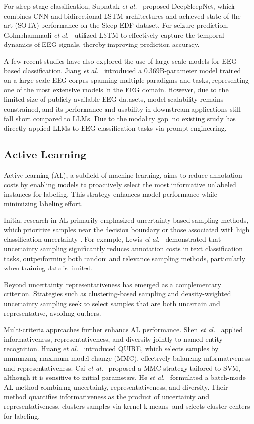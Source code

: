\documentclass[journal,twocolumn]{IEEEtran}
\begin{document}
For sleep stage classification, Supratak \textit{et al.}~\cite{supratak2017deepsleepnet} proposed DeepSleepNet, which combines CNN and bidirectional LSTM architectures and achieved state-of-the-art (SOTA) performance on the Sleep-EDF dataset. For seizure prediction, Golmohammadi \textit{et al.}~\cite{golmohammadi2017gated} utilized LSTM to effectively capture the temporal dynamics of EEG signals, thereby improving prediction accuracy.

A few recent studies have also explored the use of large-scale models for EEG-based classification. Jiang \textit{et al.}~\cite{jiang2024large} introduced a 0.369B-parameter model trained on a large-scale EEG corpus spanning multiple paradigms and tasks, representing one of the most extensive models in the EEG domain. However, due to the limited size of publicly available EEG datasets, model scalability remains constrained, and its performance and usability in downstream applications still fall short compared to LLMs. Due to the modality gap, no existing study has directly applied LLMs to EEG classification tasks via prompt engineering.

\subsection{Active Learning}
Active learning (AL), a subfield of machine learning, aims to reduce annotation costs by enabling models to proactively select the most informative unlabeled instances for labeling. This strategy enhances model performance while minimizing labeling effort.

Initial research in AL primarily emphasized uncertainty-based sampling methods, which prioritize samples near the decision boundary or those associated with high classification uncertainty \cite{Settles2009}. For example, Lewis \textit{et al.}~\cite{lewis1995sequential} demonstrated that uncertainty sampling significantly reduces annotation costs in text classification tasks, outperforming both random and relevance sampling methods, particularly when training data is limited.

Beyond uncertainty, representativeness has emerged as a complementary criterion. Strategies such as clustering-based sampling \cite{nguyen2004active} and density-weighted uncertainty sampling \cite{settles2008analysis} seek to select samples that are both uncertain and representative, avoiding outliers.

Multi-criteria approaches further enhance AL performance. Shen \textit{et al.}~\cite{Shen2004a} applied informativeness, representativeness, and diversity jointly to named entity recognition. Huang \textit{et al.}~\cite{huang2010active} introduced QUIRE, which selects samples by minimizing maximum model change (MMC), effectively balancing informativeness and representativeness. Cai \textit{et al.}~\cite{Cai2014} proposed a MMC strategy tailored to SVM, although it is sensitive to initial parameters. He \textit{et al.}~\cite{He2014} formulated a batch-mode AL method combining uncertainty, representativeness, and diversity. Their method quantifies informativeness as the product of uncertainty and representativeness, clusters samples via kernel k-means, and selects cluster centers for labeling.
\end{document}
